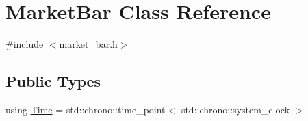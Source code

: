 \hypertarget{classMarketBar}{}\section{Market\+Bar Class Reference}
\label{classMarketBar}


{\ttfamily \#include $<$market\+\_\+bar.\+h$>$}

\subsection*{Public Types}
\begin{DoxyCompactItemize}
\item 
using \hyperlink{classMarketBar_a0d7dabe1fd00e674ef72f54bb1ff9ad0}{Time} = std\+::chrono\+::time\+\_\+point$<$ std\+::chrono\+::system\+\_\+clock $>$
\end{DoxyCompactItemize}
